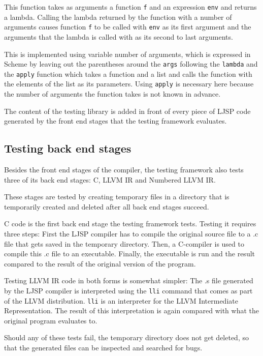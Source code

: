 \documentclass[11pt]{report}
\begin{document}
This function takes as arguments a function \texttt{f} and an expression \texttt{env} and returns a lambda. Calling the lambda returned by the function with a number of arguments causes function \texttt{f} to be called with \texttt{env} as its first argument and the arguments that the lambda is called with as its second to last arguments.

This is implemented using variable number of arguments, which is expressed in Scheme by leaving out the parentheses around the \texttt{args} following the \texttt{lambda} and the \texttt{apply} function which takes a function and a list and calls the function with the elements of the list as its parameters. Using \texttt{apply} is necessary here because the number of arguments the function takes is not known in advance.

The content of the testing library is added in front of every piece of LJSP code generated by the front end stages that the testing framework evaluates.

\subsection{Testing back end stages}

Besides the front end stages of the compiler, the testing framework also tests three of its back end stages: C, LLVM IR and Numbered LLVM IR.

These stages are tested by creating temporary files in a directory that is temporarily created and deleted after all back end stages succeed.

C code is the first back end stage the testing framework tests. Testing it requires three steps: First the LJSP compiler has to compile the original source file to a .c file that gets saved in the temporary directory. Then, a C-compiler is used to compile this .c file to an executable. Finally, the executable is run and the result compared to the result of the original version of the program.

Testing LLVM IR code in both forms is somewhat simpler: The .s file generated by the LJSP compiler is interpreted using the \texttt{lli} command that comes as part of the LLVM distribution. \texttt{lli} is an interpreter for the LLVM Intermediate Representation. The result of this interpretation is again compared with what the original program evaluates to.

Should any of these tests fail, the temporary directory does not get deleted, so that the generated files can be inspected and searched for bugs.
\end{document}
